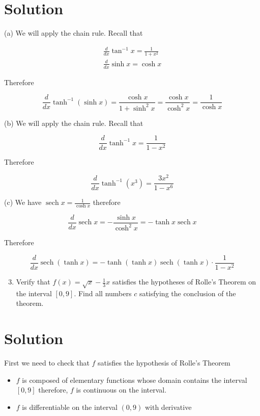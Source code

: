 \documentclass[10pt]{article}
\begin{document}
\section*{Solution}
(a) We will apply the chain rule. Recall that

$$
\begin{gathered}
\frac{d}{d x} \tan ^{-1} x=\frac{1}{1+x^{2}} \\
\frac{d}{d x} \sinh x=\cosh x
\end{gathered}
$$

Therefore

$$
\frac{d}{d x} \tanh ^{-1}(\sinh x)=\frac{\cosh x}{1+\sinh ^{2} x}=\frac{\cosh x}{\cosh ^{2} x}=\frac{1}{\cosh x}
$$

(b) We will apply the chain rule. Recall that

$$
\frac{d}{d x} \tanh ^{-1} x=\frac{1}{1-x^{2}}
$$

Therefore

$$
\frac{d}{d x} \tanh ^{-1}\left(x^{3}\right)=\frac{3 x^{2}}{1-x^{6}}
$$

(c) We have $\operatorname{sech} x=\frac{1}{\cosh x}$ therefore

$$
\frac{d}{d x} \operatorname{sech} x=-\frac{\sinh x}{\cosh ^{2} x}=-\tanh x \operatorname{sech} x
$$

Therefore

$$
\frac{d}{d x} \operatorname{sech}(\tanh x)=-\tanh (\tanh x) \operatorname{sech}(\tanh x) \cdot \frac{1}{1-x^{2}}
$$

\begin{enumerate}
  \setcounter{enumi}{2}
  \item Verify that $f(x)=\sqrt{x}-\frac{1}{3} x$ satisfies the hypotheses of Rolle's Theorem on the interval $[0,9]$. Find all numbers $c$ satisfying the conclusion of the theorem.
\end{enumerate}

\section*{Solution}
First we need to check that $f$ satisfies the hypothesis of Rolle's Theorem

\begin{itemize}
  \item $f$ is composed of elementary functions whose domain contains the interval $[0,9]$ therefore, $f$ is continuous on the interval.
  \item $f$ is differentiable on the interval $(0,9)$ with derivative
\end{itemize}
\end{document}
